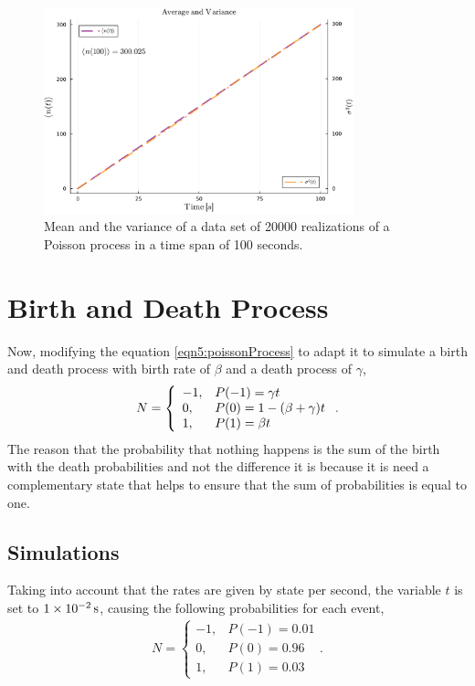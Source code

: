 \documentclass[main.tex]{subfiles}
\begin{document}
\begin{figure}[ht!]
    \centering
    \includegraphics[width=0.8\textwidth]{imgs/hw5/poissonProcessAvergeVariance.pdf}
    \caption{Mean and the variance of a data set of \num{20000} realizations of a Poisson process in a time span of 100 seconds.}
    \label{fig:poissonProcessMeanVar}
\end{figure}

\section{Birth and Death Process}

Now, modifying the equation \eqref{eqn5:poissonProcess} to adapt it to simulate a birth and death process with birth rate of $\beta$ and a death process of $\gamma$, 
\begin{gather}
    N = \left\{
        \begin{array}{ll}
            -1, & P(-1) = \gamma t \\
            0, & P(0) = 1-\qty(\beta+\gamma)t \\
            1, & P(1) = \beta t
        \end{array}
    \right.
    .\label{eqn5:birthdeath}
\end{gather}
The reason that the probability that nothing happens is the sum of the birth with the death probabilities and not the difference it is because it is need a complementary state that helps to ensure that the sum of probabilities is equal to one. %

\subsection{Simulations}

Taking into account that the rates are given by state per second, the variable $t$ is set to $\SI{1d-2}{\second}$, causing the following probabilities for each event,
\begin{gather*}
    N = \left\{
        \begin{array}{ll}
            -1, & P(-1) = 0.01 \\
            0, & P(0) = 0.96 \\
            1, & P(1) = 0.03
        \end{array}
    \right.
    .%
\end{gather*}
\end{document}
